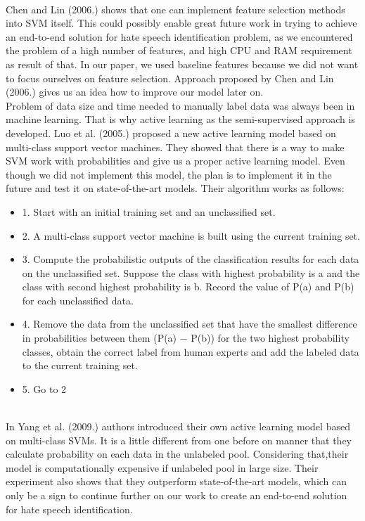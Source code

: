 \documentclass[10pt, a4paper]{article}
\begin{document}
\\Chen and Lin (2006.) shows that one can implement feature selection methods into SVM itself\citep{ChenSVMFeatures}. This could possibly enable great future work in trying to achieve an end-to-end solution for hate speech identification problem, as we encountered the problem of a high number of features, and high CPU and RAM requirement as result of that. In our paper, we used baseline features because we did not want to focus ourselves on feature selection. Approach proposed by Chen and Lin (2006.) gives us an idea how to improve our model later on.
\\Problem of data size and time needed to manually label data was always been in machine learning. That is why active learning as the semi-supervised approach is developed. Luo et al. (2005.) proposed a new active learning model based on multi-class support vector machines. They showed that there is a way to make SVM work with probabilities and give us a proper active learning model. Even though we did not implement this model, the plan is to implement it in the future and test it on state-of-the-art models. Their algorithm works as follows\citep{LuoALPlankton}:
\begin{itemize}
	\item 1. Start with an initial training set and an unclassified set.
	\item 2. A multi-class support vector machine is built using the current training set.
	\item 3. Compute the probabilistic outputs of the classification results for each data on the unclassified set. Suppose the class with highest probability is a and the class with second highest probability is b. Record the value of P(a) and P(b) for each unclassified data.
	\item 4. Remove the data from the unclassified set that have the smallest difference in probabilities between them (P(a) − P(b)) for the two highest probability classes, obtain the correct label from human experts and add the labeled data to the current training set.
	\item 5. Go to 2
\end{itemize}
\\In Yang et al. (2009.) authors introduced their own active learning model based on multi-class SVMs. It is a little different from one before on manner that they calculate probability on each data in the unlabeled pool. Considering that,their model is computationally expensive if unlabeled pool in large size\citep{YangMultiClassAL}. Their experiment also shows that they outperform state-of-the-art models, which can only be a sign to continue further on our work to create an end-to-end solution for hate speech identification.
\end{document}
